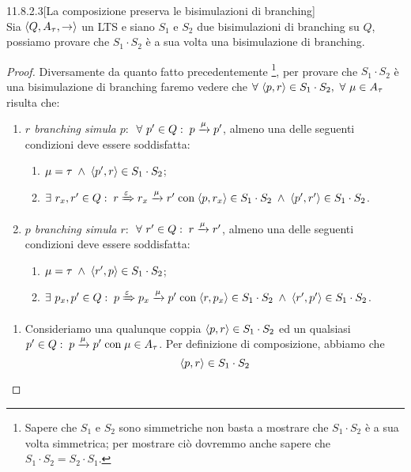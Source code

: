 \begin{customlemma}{11.8.2.3}[La composizione preserva le bisimulazioni di branching]
\label{lemma:11.8.2.3} \hfill \\
Sia $\langle Q, A_{\tau}, \rightarrow \rangle$ un LTS e siano $S_1$ e $S_2$ due bisimulazioni di branching su $Q$, possiamo provare che $S_1 \cdot S_2$ è a sua volta una bisimulazione di branching.
\end{customlemma}
\begin{proof}
Diversamente da quanto fatto precedentemente \footnote{Sapere che $S_1$ e $S_2$ sono simmetriche non basta a mostrare che $S_1 \cdot S_2$ è a sua volta simmetrica; per mostrare ciò dovremmo anche sapere che $S_1 \cdot S_2 = S_2 \cdot S_1$.}, per provare che $S_1 \cdot S_2$ è una bisimulazione di branching faremo vedere che $\forall\ \tupla{p,r} \in S_1 \cdot S_2,\ \forall\ \mu \in A_{\tau}$ risulta che:
\begin{enumerate}
\item \textit{$r$ branching simula $p$}:
$\ \forall\ p' \in Q :\; p \xrightarrow{\mu} p'$, almeno una delle seguenti condizioni deve essere soddisfatta:
\begin{enumerate}
\item $\mu = \tau \; \land \; \langle p', r \rangle \in S_1 \cdot S_2$;
\item $\exists\ r_x, r' \in Q :\; r \xRightarrow{\varepsilon} r_x \xrightarrow{\mu} r' 
	\; \text{con} \; \langle p, r_x \rangle \in S_1 \cdot S_2 
	\; \land \; \langle p', r' \rangle \in S_1 \cdot S_2$.
\end{enumerate}
\item \textit{$p$ branching simula $r$}:
$\ \forall\ r' \in Q :\; r \xrightarrow{\mu} r'$, almeno una delle seguenti condizioni deve essere soddisfatta:
\begin{enumerate}
\item $\mu = \tau \; \land \; \langle r', p \rangle \in S_1 \cdot S_2$;
\item $\exists\ p_x, p' \in Q :\; p \xRightarrow{\varepsilon} p_x \xrightarrow{\mu} p' 
	\; \text{con} \; \langle r, p_x \rangle \in S_1 \cdot S_2 
	\; \land \; \langle r', p' \rangle \in S_1 \cdot S_2$.
\end{enumerate}
\end{enumerate}
\begin{enumerate}[leftmargin=*]
\item Consideriamo una qualunque coppia $\langle p,r \rangle \in S_1 \cdot S_2$ ed un qualsiasi $p' \in Q :\; p \xrightarrow{\mu} p' \; \text{con} \; \mu \in A_{\tau}$.
Per definizione di composizione, abbiamo che \[
 	\langle p,r \rangle \in S_1 \cdot S_2 
\]
\end{enumerate}
\end{proof}
